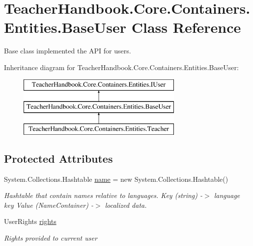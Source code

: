 \hypertarget{class_teacher_handbook_1_1_core_1_1_containers_1_1_entities_1_1_base_user}{}\section{Teacher\+Handbook.\+Core.\+Containers.\+Entities.\+Base\+User Class Reference}
\label{class_teacher_handbook_1_1_core_1_1_containers_1_1_entities_1_1_base_user}


Base class implemented the A\+PI for users.  


Inheritance diagram for Teacher\+Handbook.\+Core.\+Containers.\+Entities.\+Base\+User\+:\begin{figure}[H]
\begin{center}
\leavevmode
\includegraphics[height=3.000000cm]{d2/dbe/class_teacher_handbook_1_1_core_1_1_containers_1_1_entities_1_1_base_user}
\end{center}
\end{figure}
\subsection*{Protected Attributes}
\begin{DoxyCompactItemize}
\item 
System.\+Collections.\+Hashtable \mbox{\hyperlink{class_teacher_handbook_1_1_core_1_1_containers_1_1_entities_1_1_base_user_ad8da6882147f62d42960e2a436b8dff1}{name}} = new System.\+Collections.\+Hashtable()
\begin{DoxyCompactList}\small\item\em Hashtable that contain names relative to languages. Key (string) -\/$>$ language key Value (Name\+Container) -\/$>$ localized data. \end{DoxyCompactList}\item 
User\+Rights \mbox{\hyperlink{class_teacher_handbook_1_1_core_1_1_containers_1_1_entities_1_1_base_user_ad553bd1715f8aa5ab9253027533b8287}{rights}}
\begin{DoxyCompactList}\small\item\em Rights provided to current user \end{DoxyCompactList}\end{DoxyCompactItemize}
